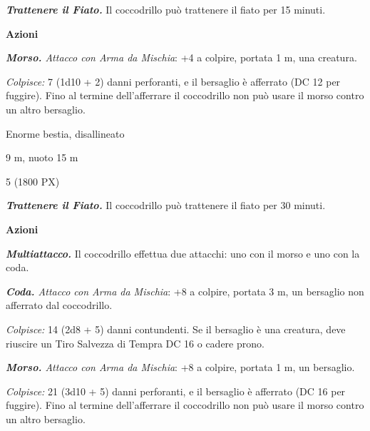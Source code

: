 \begin{multicols}{2}
{\emph{\textbf{Trattenere il Fiato.}} Il coccodrillo può trattenere il fiato per 15 minuti.

\textbf{Azioni}

\emph{\textbf{Morso.} Attacco con Arma da Mischia}: +4 a colpire, portata 1 m, una creatura.

\emph{Colpisce:} 7 (1d10 + 2) danni perforanti, e il bersaglio è afferrato (DC 12 per fuggire). Fino al termine dell'afferrare il coccodrillo non può usare il morso contro un altro bersaglio.

\begin{description}[noitemsep, topsep=0pt, parsep=0pt, partopsep=0pt, itemsep=1pt, leftmargin=2.35cm,  labelwidth=2.2cm, itemindent=0cm, listparindent=0pt] %
\setlength{\baselineskip}{10pt}
\item[\textbf{Taglia/Tipo}] Enorme bestia, disallineato
\item[\textbf{Caratt.}] 
\item[\textbf{Punti Ferita}] 
\item[\textbf{Tiri Salvez.}] 
\item[\textbf{Movimento}] 9 m, nuoto 15 m
\item[\textbf{Sfida}] 5 (1800 PX)
\end{description}
\smallskip

\emph{\textbf{Trattenere il Fiato.}} Il coccodrillo può trattenere il fiato per 30 minuti.

\textbf{Azioni}

\emph{\textbf{Multiattacco.}} Il coccodrillo effettua due attacchi: uno con il morso e uno con la coda.

\emph{\textbf{Coda.} Attacco con Arma da Mischia}: +8 a colpire, portata 3 m, un bersaglio non afferrato dal coccodrillo.

\emph{Colpisce:} 14 (2d8 + 5) danni contundenti. Se il bersaglio è una creatura, deve riuscire un Tiro Salvezza di Tempra DC 16 o cadere prono.

\emph{\textbf{Morso.} Attacco con Arma da Mischia}: +8 a colpire, portata 1 m, un bersaglio.

\emph{Colpisce:} 21 (3d10 + 5) danni perforanti, e il bersaglio è afferrato (DC 16 per fuggire). Fino al termine dell'afferrare il coccodrillo non può usare il morso contro un altro bersaglio.

}
\end{multicols}
